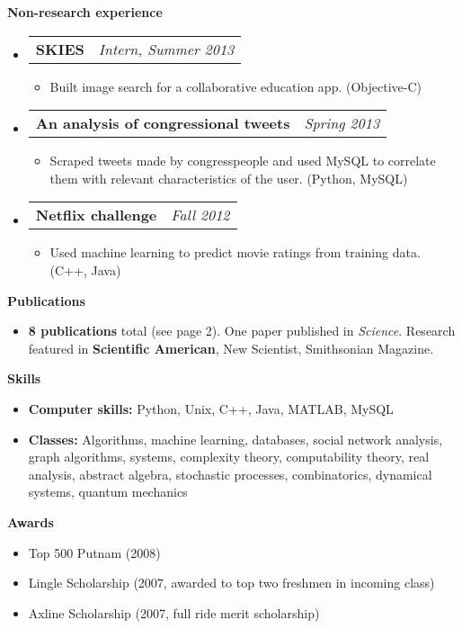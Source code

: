 \documentclass[letterpaper,10pt]{article}
\makeatletter
\newcommand{\resitem}[1]{\item #1 \vspace{-2pt}}
\newcommand{\resheading}[1]{{\large \colorbox{mygrey}{\begin{minipage}{\textwidth}{\textbf{#1 \vphantom{p\^{E}}}}\end{minipage}}}}
\newcommand{\ressubheading}[4]{
\begin{tabular*}{7.0in}{l@{\extracolsep{\fill}}r}
		\textbf{#1} & \textit{#4} \\
\end{tabular*}\vspace{-6pt}}
\makeatother
\begin{document}
\resheading{Non-research experience}
\begin{itemize}
\item
	\ressubheading{SKIES}{Pasadena, CA}{Intern}{Intern, Summer 2013}
	\begin{itemize}
		\resitem{Built image search for a collaborative education app.  (Objective-C)}
	\end{itemize}

\item
	\ressubheading{An analysis of congressional tweets}{Pasadena, CA}{Student}{Spring 2013}
	\begin{itemize}
		\resitem{Scraped tweets made by congresspeople and used MySQL to correlate them with relevant characteristics of the user.  (Python, MySQL)}
	\end{itemize}
\item
	\ressubheading{Netflix challenge}{Pasadena, CA}{Student}{Fall 2012}
	\begin{itemize}
		\resitem{Used machine learning to predict movie ratings from training data.  (C++, Java)}
	\end{itemize}
\end{itemize}

\resheading{Publications}
\begin{itemize}
	\item {\bf 8 publications} total (see page 2).  One paper published in \emph{Science}.  Research featured in {\bf Scientific American}, New Scientist, Smithsonian Magazine.
\end{itemize}

\resheading{Skills}
\begin{itemize}
\item \textbf{Computer skills:} Python, Unix, C++, Java, MATLAB, MySQL
\item \textbf{Classes:} Algorithms, machine learning, databases, social network analysis, graph algorithms, systems, complexity theory, computability theory, real analysis, abstract algebra, stochastic processes, combinatorics, dynamical systems, quantum mechanics
\end{itemize}

\resheading{Awards}
\begin{itemize}
	\item Top 500 Putnam (2008)
	\item Lingle Scholarship (2007, awarded to top two freshmen in incoming class)
	\item Axline Scholarship (2007, full ride merit scholarship)
\end{itemize}
\end{document}
